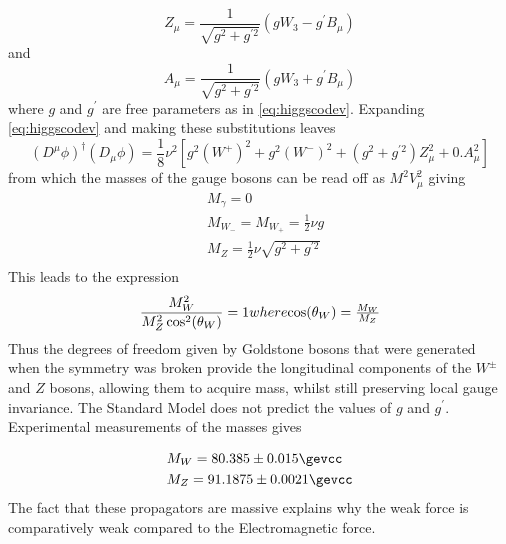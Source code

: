 \begin{equation}
  Z_{\mu} = \frac{1}{\sqrt{g^{2}+g^{\prime 2}}} (gW_{3} - g^{\prime}B_{\mu})
\end{equation}
 and
 \begin{equation}
  A_{\mu} = \frac{1}{\sqrt{g^{2}+g^{\prime 2}}} (gW_{3} + g^{\prime}B_{\mu})
\end{equation}
 where $g$ and $g^{\prime}$ are free parameters as in \autoref{eq:higgscodev}. Expanding \autoref{eq:higgscodev} and making these substitutions leaves
\begin{equation}
  (D^{\mu}\phi)^\dagger(D_{\mu}\phi) = \frac{1}{8}\nu^{2}[g^{2}(W^{+})^{2} + g^{2}(W^{-})^{2} + (g^{2}+g^{\prime 2})Z_{\mu}^{2} + 0.A_{\mu}^{2}] 
  \end{equation}
from which the masses of the gauge bosons can be read off as $M^{2}V_{\mu}^{2}$ giving
\begin{equation}
  \begin{split}
    &M_{\gamma} = 0\\
    &M_{W_{-}} = M_{W_{+}} = \frac{1}{2}\nu g\\
    &M_{Z} =  \frac{1}{2}\nu\sqrt{g^{2}+g^{\prime 2}} \\
  \end{split}
\end{equation}
This leads to the expression
\begin{equation}
  \frac{M_{W}^{2}}{M_{Z}^{2}\cos^{2}(\theta_{W})}  = 1 $$where$$
  \cos(\theta_{W}) =  \frac{M_{W}}{M_{Z}}
\end{equation}
Thus the degrees of freedom given by Goldstone bosons that were generated when the symmetry was broken provide the longitudinal components of the $W^{\pm}$ and $Z$ bosons, allowing them to acquire mass, whilst still preserving local gauge invariance. The Standard Model does not predict the values of $g$ and $g^{\prime}$. Experimental measurements of the masses gives

\begin{equation}
  \begin{split}
  &M_{W} = 80.385 \pm 0.015 \gevcc\\
    &M_{Z} = 91.1875 \pm 0.0021 \gevcc\\
    \end{split}
\end{equation}
The fact that these propagators are massive explains why the weak force is comparatively weak compared to the Electromagnetic force.
